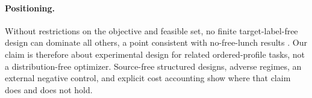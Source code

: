 \paragraph{Positioning.}
Without restrictions on the objective and feasible set, no finite
target-label-free design can dominate all others, a point consistent with
no-free-lunch results \citep{WolpertMacready1997}.  Our claim is therefore
about experimental design for related ordered-profile tasks, not a
distribution-free optimizer.  Source-free structured designs, adverse
regimes, an external negative control, and explicit cost accounting show where
that claim does and does not hold.
